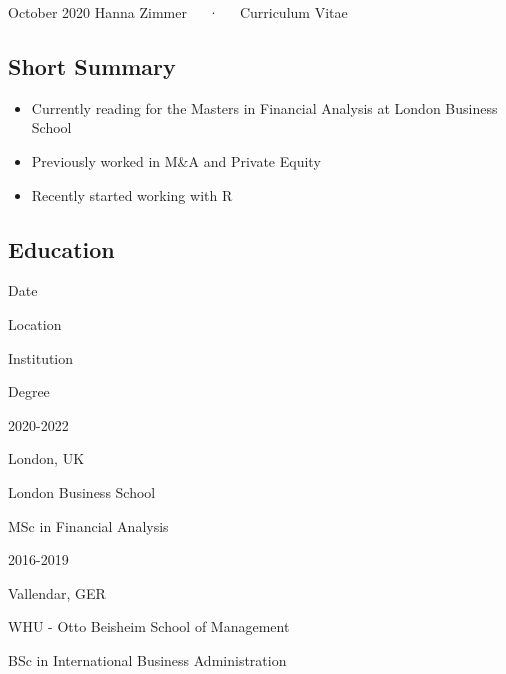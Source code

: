 \documentclass[11pt, a4paper]{awesome-cv}
\providecommand{\tightlist}{%
	\setlength{\itemsep}{0pt}\setlength{\parskip}{0pt}}
\begin{document}
\makecvheader

\makecvfooter
  {October 2020}
    {Hanna Zimmer~~~·~~~Curriculum Vitae}
  {\thepage}





\hypertarget{short-summary}{%
\subsection{Short Summary}\label{short-summary}}

\begin{itemize}
\tightlist
\item
  Currently reading for the Masters in Financial Analysis at London Business School
\item
  Previously worked in M\&A and Private Equity
\item
  Recently started working with R
\end{itemize}

\hypertarget{education}{%
\subsection{Education}\label{education}}

Date

Location

Institution

Degree

2020-2022

London, UK

London Business School

MSc in Financial Analysis

2016-2019

Vallendar, GER

WHU - Otto Beisheim School of Management

BSc in International Business Administration
\end{document}
